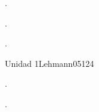 \begin{syllabus}


\begin{justification}
.
\end{justification}

\begin{goals}
\item .
\item .
\end{goals}

\begin{outcomes}
    \item {} %
    \item {} %
    \item {} %
    \item {} %
    \item {} %
\end{outcomes}

\begin{competences}
    \item {}
    \item {}
    \item {}
    \item {}
\end{competences}

\begin{unit}{Unidad 1}{}{Lehmann05}{12}{4}
   \begin{topics}
      \item .
   \end{topics}
   \begin{learningoutcomes}
      \item .
   \end{learningoutcomes}
\end{unit}



\begin{coursebibliography}
\end{coursebibliography}

\end{syllabus}
